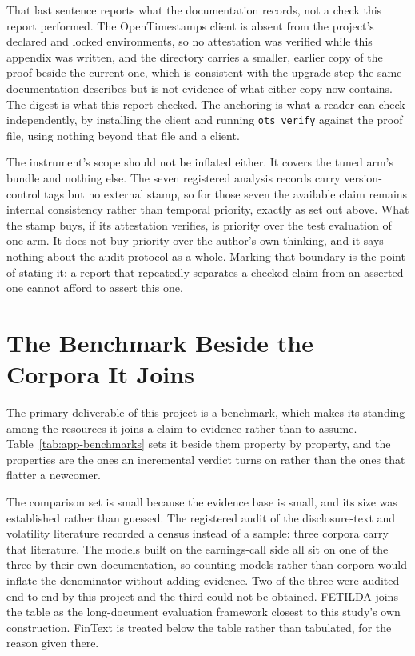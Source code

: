 That last sentence reports what the documentation records, not a check this
report performed. The OpenTimestamps client is absent from the project's
declared and locked environments, so no attestation was verified while this
appendix was written, and the directory carries a smaller, earlier copy of the
proof beside the current one, which is consistent with the upgrade step the same
documentation describes but is not evidence of what either copy now
contains. %
The digest is what this report checked. The anchoring is what a reader can check
independently, by installing the client and running \texttt{ots verify} against
the proof file, using nothing beyond that file and a client.

The instrument's scope should not be inflated either. It covers the tuned arm's
bundle and nothing else. The seven registered analysis records carry
version-control tags but no external stamp, so for those seven the available
claim remains internal consistency rather than temporal priority, exactly as set
out above. What the stamp buys, if its attestation verifies, is priority over
the test evaluation of one arm. It does not buy priority over the author's own
thinking, and it says nothing about the audit protocol as a whole. Marking that
boundary is the point of stating it: a report that repeatedly separates a
checked claim from an asserted one cannot afford to assert this one.

\FloatBarrier
\section{The Benchmark Beside the Corpora It Joins}
\label{app:external:benchmarks}

The primary deliverable of this project is a benchmark, which makes its standing
among the resources it joins a claim to evidence rather than to assume.
Table~\ref{tab:app-benchmarks} sets it beside them property by property, and the
properties are the ones an incremental verdict turns on rather than the ones that
flatter a newcomer.

The comparison set is small because the evidence base is small, and its size was
established rather than guessed. The registered audit of the disclosure-text and
volatility literature recorded a census instead of a sample: three corpora carry
that literature. The models built on the earnings-call side all sit on one of the
three by their own documentation, so counting models rather than corpora would
inflate the denominator without adding evidence. %
Two of the three were audited end to end by this project and the third could not
be obtained. FETILDA joins the table as the long-document evaluation framework
closest to this study's own construction. FinText is treated below the table
rather than tabulated, for the reason given there.

